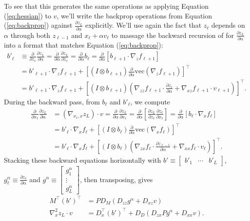 \documentclass{article}
\begin{document}
To see that this generates the same operations as applying Equation (\ref{eq:hessian}) to $v$, we'll write the backprop
operations from Equation (\ref{eq:backprop}) against $\frac{\partial z_L}{\partial \alpha}$ explicitly. We'll use again
the fact that $z_\ell$ depends on $\alpha$ through both $z_{\ell-1}$ and $x_\ell + \alpha v_\ell$ to massage the
backward recursion of for $\frac{\partial z_L}{\partial \alpha}$ into a format that matches Equation
(\ref{eq:backprop}):
\begin{align}
  b'_\ell &\equiv \frac{\partial}{\partial z_\ell} \frac{\partial z_L}{\partial \alpha}
  = \frac{\partial}{\partial \alpha} \frac{\partial z_L}{\partial z_\ell}
  = \frac{\partial}{\partial \alpha} b_\ell
  = \frac{\partial}{\partial \alpha} \left[b_{\ell+1} \cdot \nabla_z f_{\ell+1}\right] \\
  &= b'_{\ell+1} \cdot \nabla_z f_{\ell+1} + \left[\left(I \otimes b_{\ell+1}\right) \frac{\partial}{\partial \alpha} \text{vec}\left(\nabla_z f_{\ell+1}\right) \right]^\top \\
  &= b'_{\ell+1} \cdot \nabla_z f_{\ell+1} + \left[\left(I \otimes b_{\ell+1}\right) \left(\nabla_{zz} f_{\ell+1} \cdot \frac{\partial z_\ell}{\partial \alpha} + \nabla_{xz} f_{\ell+1} \cdot v_{\ell+1}\right)\right]^\top.
\end{align}
During the backward pass, from $b_\ell$ and $b'_\ell$, we compute
\begin{align}
  \frac{\partial }{\partial x_\ell} \frac{\partial z_L}{\partial \alpha}
  &=\left(\nabla_{x_\ell, x} z_L\right) \cdot v
  = \frac{\partial}{\partial \alpha} \frac{\partial z_L}{\partial x_\ell}
  = \frac{\partial}{\partial \alpha} \left[\frac{\partial z_L}{\partial z_{\ell}} \frac{\partial z_\ell}{\partial x_\ell}\right]
  = \frac{\partial}{\partial \alpha} \left[b_\ell \cdot \nabla_x f_\ell\right] \\
  &= b'_\ell \cdot \nabla_x f_\ell + \left[\left(I\otimes b_\ell\right) \frac{\partial}{\partial \alpha} \text{vec}\left(\nabla_x f_\ell\right)\right]^\top \\
  &= b'_\ell \cdot \nabla_x f_\ell + \left[\left(I\otimes b_\ell\right) \left(\nabla_{zx} f_\ell \cdot \frac{\partial z_{\ell-1}}{\partial \alpha} + \nabla_{xx} f_\ell \cdot v_\ell\right)\right]^\top.
\end{align}
Stacking these backward equations horizontally with $b'\equiv\left[
  \begin{smallmatrix}
    b'_1 & \cdots & b'_L
  \end{smallmatrix}
\right]$,
$g^\alpha_\ell \equiv \frac{\partial z_\ell}{\partial \alpha}$ and $g^\alpha\equiv\left[
  \begin{smallmatrix}
    g^\alpha_1 \\ \vdots \\ g^\alpha_L
  \end{smallmatrix}
\right]$, then transposing, gives
\begin{align}
  \label{eq:pearlmutter-2}
  M^\top \left(b'\right)^\top &= P D_M  \left(D_{zz} g^\alpha + D_{xz} v\right) \nonumber\\
  \nabla_x^2 z_L \cdot v &= D_x^\top \left(b'\right)^\top + D_D \left(D_{zx} P g^\alpha + D_{xx} v\right).
\end{align}
\end{document}
